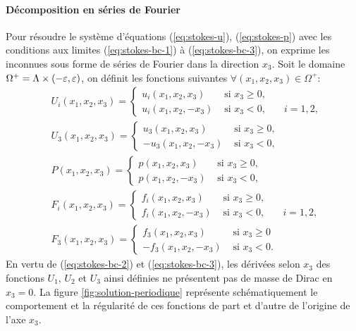 \paragraph{Décomposition en séries de Fourier}
Pour résoudre le système d'équations (\ref{eq:stokes-u}),
(\ref{eq:stokes-p}) avec les conditions aux limites (\ref{eq:stokes-bc-1}) à
(\ref{eq:stokes-bc-3}), on exprime les inconnues sous forme de séries
de Fourier dans la direction $x_3$. Soit le domaine $\Omega^+ = \Lambda
\times (-\varepsilon, \varepsilon)$, on définit les fonctions suivantes
$\forall (x_1, x_2, x_3)\in \Omega^+$:
\begin{align}
  & U_i(x_1, x_2, x_3) = \left\{
    \begin{array}{lll}
      u_i(x_1, x_2, x_3) &\text{ si } x_3 \geq 0,\\
      u_i(x_1, x_2, -x_3) &\text{ si } x_3 < 0,     & \quad i = 1,2,
    \end{array}
  \right.\label{eq:decomp-1}\\
  & U_3(x_1, x_2, x_3) = \left\{
    \begin{array}{ll}
       u_3(x_1, x_2, x_3) &\text{ si } x_3 \geq 0,\\
      -u_3(x_1, x_2, -x_3) &\text{ si } x_3 < 0,
    \end{array}
  \right.\label{eq:decomp-2}\\
  & P(x_1, x_2, x_3) = \left\{
    \begin{array}{ll}
      p(x_1, x_2, x_3) &\text{ si } x_3 \geq 0,\\
      p(x_1, x_2, -x_3) &\text{ si } x_3 < 0,
    \end{array}
  \right.\label{eq:decomp-3}\\
  & F_i(x_1, x_2, x_3) = \left\{
    \begin{array}{lll}
      f_i(x_1, x_2, x_3) &\text{ si } x_3 \geq 0,\\
      f_i(x_1, x_2, -x_3) &\text{ si } x_3 < 0,     & \quad i = 1,2,
    \end{array}
  \right.\label{eq:decomp-4}\\
  & F_3(x_1, x_2, x_3) = \left\{
    \begin{array}{ll}
      f_3(x_1, x_2, x_3) &\text{ si } x_3 \geq 0\\
     -f_3(x_1, x_2, -x_3) &\text{ si } x_3 < 0.
    \end{array}
  \right.\label{eq:decomp-5}
\end{align}
En vertu de (\ref{eq:stokes-bc-2}) et (\ref{eq:stokes-bc-3}), les
dérivées selon $x_3$ des fonctions $U_1$, $U_2$ et $U_3$ ainsi
définies ne présentent pas de masse de Dirac en $x_3 = 0$. La figure
\ref{fig:solution-periodique} représente schématiquement le
comportement et la régularité de ces fonctions de part et d'autre de
l'origine de l'axe $x_3$.


